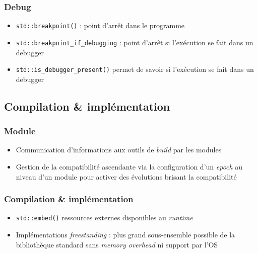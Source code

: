 \documentclass[C++.tex]{subfiles}
\begin{document}
\begin{frame}[fragile]
	\frametitle{Debug}
	\begin{itemize}
		\item \lstinline|std::breakpoint()| : point d'arrêt dans le programme
		\item \lstinline|std::breakpoint_if_debugging| : point d'arrêt si l'exécution se fait dans un debugger
		\item \lstinline|std::is_debugger_present()| permet de savoir si l'exécution se fait dans un debugger
	\end{itemize}
\end{frame}

\subsection*{Compilation \& implémentation}
\begin{frame}[fragile]
	\frametitle{Module}
	\begin{itemize}
		\item Communication d'informations aux outils de \textit{build} par les modules
		\item Gestion de la compatibilité ascendante via la configuration d'un \textit{epoch} au niveau d'un module pour activer des évolutions brisant la compatibilité

	\end{itemize}
\end{frame}

\begin{frame}[fragile]
	\frametitle{Compilation \& implémentation}
	\begin{itemize}
		\item \lstinline|std::embed()| ressources externes disponibles au \textit{runtime} 


		\item Implémentations \textit{freestanding} : plus grand sous-ensemble possible de la bibliothèque standard sans \textit{memory overhead} ni support par l'OS

	\end{itemize}
\end{frame}
\end{document}

